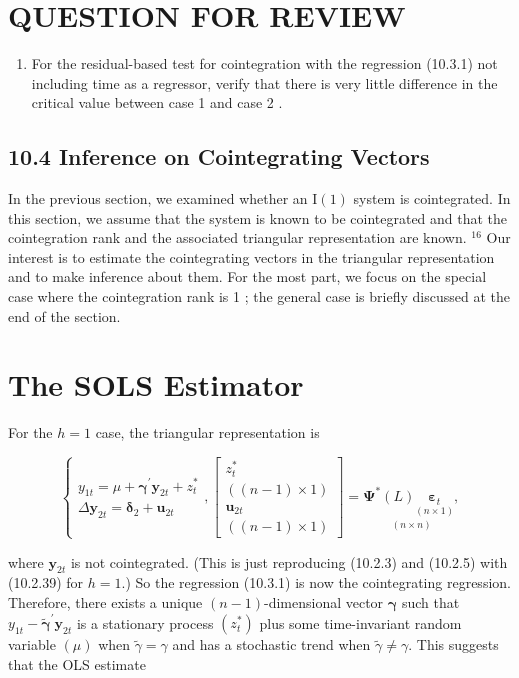 \documentclass[10pt]{article}
\begin{document}
\section*{QUESTION FOR REVIEW}
\begin{enumerate}
  \item For the residual-based test for cointegration with the regression (10.3.1) not including time as a regressor, verify that there is very little difference in the critical value between case 1 and case 2 .
\end{enumerate}

\subsection*{10.4 Inference on Cointegrating Vectors}
In the previous section, we examined whether an $\mathrm{I}(1)$ system is cointegrated. In this section, we assume that the system is known to be cointegrated and that the cointegration rank and the associated triangular representation are known. ${ }^{16}$ Our interest is to estimate the cointegrating vectors in the triangular representation and to make inference about them. For the most part, we focus on the special case where the cointegration rank is 1 ; the general case is briefly discussed at the end of the section.

\section*{The SOLS Estimator}
For the $h=1$ case, the triangular representation is

\[
\left\{\begin{array}{c}
y_{1 t}=\mu+\boldsymbol{\gamma}^{\prime} \mathbf{y}_{2 t}+z_{t}^{*}  \tag{10.4.1}\\
\Delta \mathbf{y}_{2 t}=\boldsymbol{\delta}_{2}+\mathbf{u}_{2 t}
\end{array},\left[\begin{array}{c}
z_{t}^{*} \\
((n-1) \times 1) \\
\mathbf{u}_{2 t} \\
((n-1) \times 1)
\end{array}\right]=\underset{(n \times n)}{\boldsymbol{\Psi}^{*}(L) \underset{(n \times 1)}{\boldsymbol{\varepsilon}_{t}},}\right.
\]

where $\mathbf{y}_{2 t}$ is not cointegrated. (This is just reproducing (10.2.3) and (10.2.5) with (10.2.39) for $h=1$.) So the regression (10.3.1) is now the cointegrating regression. Therefore, there exists a unique $(n-1)$-dimensional vector $\boldsymbol{\gamma}$ such that $y_{1 t}-\tilde{\boldsymbol{\gamma}}^{\prime} \mathbf{y}_{2 t}$ is a stationary process $\left(z_{t}^{*}\right)$ plus some time-invariant random variable $(\mu)$ when $\tilde{\gamma}=\gamma$ and has a stochastic trend when $\tilde{\gamma} \neq \gamma$. This suggests that the OLS estimate
\end{document}
